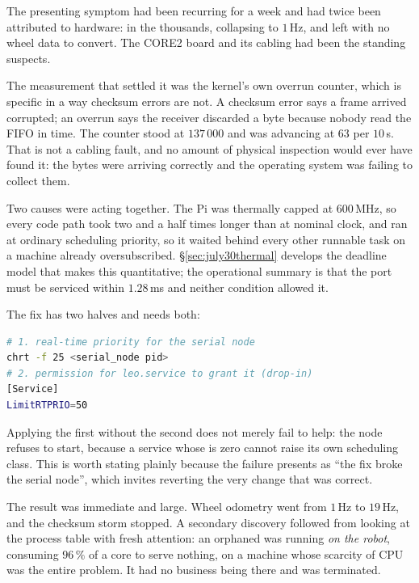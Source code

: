 The presenting symptom had been recurring for a week and had twice been
attributed to hardware:  in the
thousands,  collapsing to $1$\,Hz, and
 left with no wheel data to convert. The
CORE2 board and its cabling had been the standing suspects.

The measurement that settled it was the kernel's own overrun counter, which
is specific in a way checksum errors are not. A checksum error says a frame
arrived corrupted; an overrun says the receiver discarded a byte because
nobody read the FIFO in time. The counter stood at $137\,000$ and was
advancing at $63$ per $10$\,s. That is not a cabling fault, and no amount of
physical inspection would ever have found it: the bytes were arriving
correctly and the operating system was failing to collect them.

Two causes were acting together. The Pi was thermally capped at $600$\,MHz,
so every code path took two and a half times longer than at nominal clock,
and  ran at ordinary scheduling priority, so it waited
behind every other runnable task on a machine already oversubscribed.
\S\ref{sec:july30thermal} develops the deadline model that makes this
quantitative; the operational summary is that the port must be serviced
within $1.28$\,ms and neither condition allowed it.

The fix has two halves and needs both:
\begin{lstlisting}[language=bash]
# 1. real-time priority for the serial node
chrt -f 25 <serial_node pid>
# 2. permission for leo.service to grant it (drop-in)
[Service]
LimitRTPRIO=50
\end{lstlisting}
Applying the first without the second does not merely fail to help: the node
refuses to start, because a service whose  is zero
cannot raise its own scheduling class. This is worth stating plainly because
the failure presents as ``the fix broke the serial node'', which invites
reverting the very change that was correct.

The result was immediate and large. Wheel odometry went from $1$\,Hz to
$19$\,Hz, and the checksum storm stopped. A secondary discovery followed from
looking at the process table with fresh attention: an orphaned
 was running \emph{on the robot}, consuming $96\,\%$
of a core to serve nothing, on a machine whose scarcity of CPU was the entire
problem. It had no business being there and was terminated.

